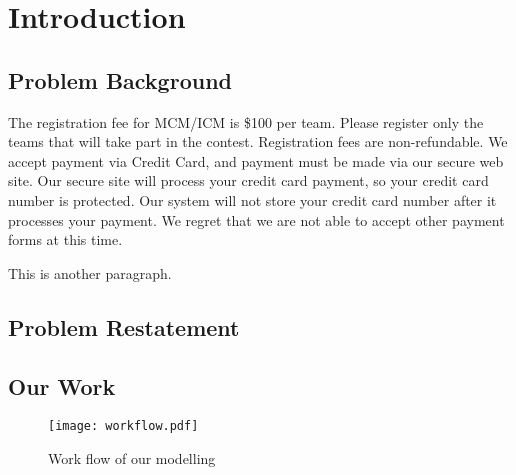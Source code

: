 \section{Introduction}\label{sec:intro}

\subsection{Problem Background}


The registration fee for MCM/ICM is \$100 per team. Please register only the teams that will take part in the contest. Registration fees are non-refundable. We accept payment via Credit Card, and payment must be made via our secure web site. Our secure site will process your credit card payment, so your credit card number is protected. Our system will not store your credit card number after it processes your payment. We regret that we are not able to accept other payment forms at this time.


This is another paragraph.

\subsection{Problem Restatement}

\subsection{Our Work}

\begin{figure}\caption{Work flow of our modelling}
    \begin{center}
        \texttt{[image: workflow.pdf]}
    \end{center}\end{figure}
